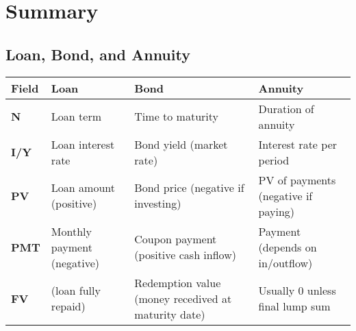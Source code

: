 \chapter{Summary}
\section{Loan, Bond, and Annuity}

\begin{table}[h!]
\centering
\begin{tabular}{|>{\raggedright\arraybackslash}p{3cm} | 
                >{\raggedright\arraybackslash}p{4cm} | 
                >{\raggedright\arraybackslash}p{4cm} | 
                >{\raggedright\arraybackslash}p{4cm}|}
\hline
\textbf{Field} & \textbf{Loan} & \textbf{Bond} & \textbf{Annuity} \\
\hline
\textbf{N} & Loan term & Time to maturity & Duration of annuity \\
\hline
\textbf{I/Y} & Loan interest rate & Bond yield (market rate) & Interest rate per period \\
\hline
\textbf{PV} & Loan amount (positive) & Bond price (negative if investing) & PV of payments (negative if paying) \\
\hline
\textbf{PMT} & Monthly payment (negative) & Coupon payment (positive cash inflow) & Payment (depends on in/outflow) \\
\hline
\textbf{FV} & 0 (loan fully repaid) & Redemption value (money recedived at maturity date) & Usually 0 unless final lump sum \\
\hline
\end{tabular}
\end{table}
